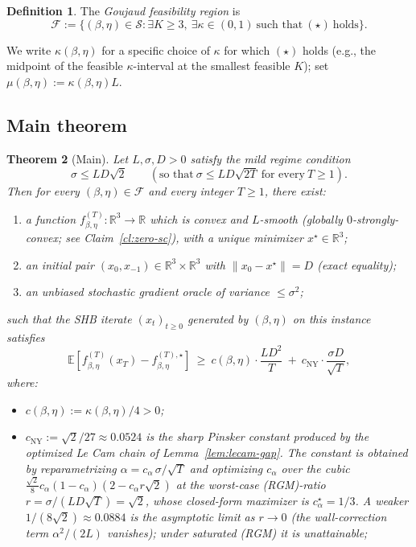 \documentclass[11pt]{article}
\newtheorem{theorem}{Theorem}[section]
\theoremstyle{definition}
\newtheorem{definition}[theorem]{Definition}
\theoremstyle{remark}
\begin{document}
\begin{definition}
The \emph{Goujaud feasibility region} is
\[
  \mathcal{F} := \big\{(\beta,\eta) \in \mathcal{S} : \exists K \geq 3,\ \exists \kappa \in (0,1)\ \text{such that}\ (\star)\ \text{holds}\big\}.
\]
\end{definition}

We write $\kappa(\beta,\eta)$ for a specific choice of $\kappa$ for which $(\star)$ holds (e.g., the midpoint of the feasible $\kappa$-interval at the smallest feasible $K$); set $\mu(\beta,\eta) := \kappa(\beta,\eta) L$.

\subsection{Main theorem}
\label{sec:main-theorem}

\begin{theorem}[Main]
\label{thm:main}
Let $L, \sigma, D > 0$ satisfy the mild regime condition
\begin{equation}
  \sigma \leq L D\sqrt 2 \qquad (\text{so that}\ \sigma \leq L D\sqrt{2T}\ \text{for every}\ T \geq 1).\tag{RGM}
\end{equation}
Then for every $(\beta, \eta) \in \mathcal{F}$ and every integer $T \geq 1$, there exist:
\begin{enumerate}
\item a function $f_{\beta,\eta}^{(T)} : \mathbb{R}^3 \to \mathbb{R}$ which is convex and $L$-smooth (globally $0$-strongly-convex; see Claim~\ref{cl:zero-sc}), with a unique minimizer $x^\star \in \mathbb{R}^3$;
\item an initial pair $(x_0, x_{-1}) \in \mathbb{R}^3 \times \mathbb{R}^3$ with $\|x_0 - x^\star\| = D$ (exact equality);
\item an unbiased stochastic gradient oracle of variance $\leq \sigma^2$;
\end{enumerate}
such that the SHB iterate $(x_t)_{t\geq 0}$ generated by $(\beta,\eta)$ on this instance satisfies
\begin{equation}
  \mathbb{E}[f_{\beta,\eta}^{(T)}(x_T) - f_{\beta,\eta}^{(T),\star}] \ \geq\ c(\beta,\eta) \cdot \frac{L D^2}{T}\ +\ c_{\mathrm{NY}} \cdot \frac{\sigma D}{\sqrt T},\tag{MAIN}
\end{equation}
where:
\begin{itemize}
\item $c(\beta,\eta) := \kappa(\beta,\eta) / 4 > 0$;
\item $c_{\mathrm{NY}} := \sqrt 2/27 \approx 0.0524$ is the sharp Pinsker constant produced by the optimized Le Cam chain of Lemma~\ref{lem:lecam-gap}. The constant is obtained by reparametrizing $\alpha = c_\alpha\,\sigma/\sqrt T$ and optimizing $c_\alpha$ over the cubic $\frac{\sqrt 2}{8}c_\alpha(1-c_\alpha)(2 - c_\alpha r\sqrt 2)$ at the worst-case (RGM)-ratio $r = \sigma/(LD\sqrt T) = \sqrt 2$, whose closed-form maximizer is $c_\alpha^\star = 1/3$. A weaker $1/(8\sqrt 2) \approx 0.0884$ is the asymptotic limit as $r \to 0$ (the wall-correction term $\alpha^2/(2L)$ vanishes); under saturated (RGM) it is unattainable;

\end{itemize}
\end{theorem}
\end{document}
